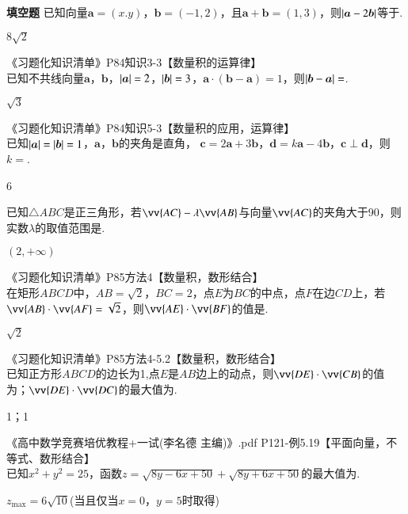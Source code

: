 \begin{exercise}{\bf 填空题}
      已知向量$\bm a=(x.y)$，$\bm b=(-1,2)$，且$\bm a+\bm b=(1,3)$，则$\left| \bm a-2\bm b \right|$等于\tk.
      \begin{answer}
        $8\sqrt{2}$
      \end{answer}
    \item 《习题化知识清单》P84知识3-3【数量积的运算律】\\
      已知不共线向量$\bm a$，$\bm b$，$\left| \bm a \right|=2$，$\left| \bm b \right|=3$，$\bm a\cdot(\bm b-\bm a)=1$，则$\left| \bm b-\bm a \right|=$\tk.
      \begin{answer}
        $\sqrt{3}$
      \end{answer}
    \item 《习题化知识清单》P84知识5-3【数量积的应用，运算律】\\
      已知$\left| \bm a \right|=\left| \bm b \right|=1$，$\bm a$，$\bm b$的夹角是直角，
      $\bm c=2\bm a+3\bm b$，$\bm d=k\bm a-4\bm b$，$\bm c\perp\bm d$，则$k=$\tk.
      \begin{answer}
        6
      \end{answer}
      已知$\triangle{ABC}$是正三角形，若$\vv{AC}-\lambda\vv{AB}$与向量$\vv{AC}$的夹角大于90\degree，则实数$\lambda$的取值范围是\tk.
      \begin{answer}
        $(2,+\infty)$
      \end{answer}
    \item 《习题化知识清单》P85方法4【数量积，数形结合】\\
      在矩形$ABCD$中，$AB=\sqrt{2}$，$BC=2$，点$E$为$BC$的中点，点$F$在边$CD$上，若$\vv{AB}\cdot\vv{AF}=\sqrt{2}$，则$\vv{AE}\cdot\vv{BF}$的值是\tk.
      \begin{answer}
        $\sqrt{2}$
      \end{answer}
    \item 《习题化知识清单》P85方法4-5.2【数量积，数形结合】\\
      已知正方形$ABCD$的边长为1,点$E$是$AB$边上的动点，则$\vv{DE}\cdot\vv{CB}$的值为\tk；$\vv{DE}\cdot\vv{DC}$的最大值为\tk.
      \begin{answer}
        1；1
      \end{answer}
    \item 《高中数学竞赛培优教程+一试(李名德 主编)》.pdf P121-例5.19【平面向量，不等式、数形结合】\\
      已知$x^2+y^2=25$，函数$z=\sqrt{8y-6x+50}+\sqrt{8y+6x+50}$的最大值为\tk.
      \begin{answer}
        $z_{\max}=6\sqrt{10}$(当且仅当$x=0$，$y=5$时取得)
      \end{answer}

\end{exercise}
